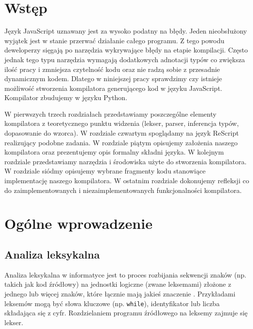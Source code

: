 \documentclass[a4paper,12pt]{book} %
\begin{document}
\sloppy



\thispagestyle{empty}


\newpage{}

\thispagestyle{empty}

\newpage{}



\tableofcontents{}




\chapter*{Wstęp}
Język JavaScript uznawany jest za wysoko podatny na błędy. Jeden nieobsłużony wyjątek jest w stanie przerwać działanie całego programu. Z tego powodu deweloperzy sięgają po narzędzia wykrywające błędy na etapie kompilacji. Często jednak tego typu narzędzia wymagają dodatkowych adnotacji typów co zwiększa ilość pracy i zmniejsza czytelność kodu oraz nie radzą sobie z przesadnie dynamicznym kodem. Dlatego w niniejszej pracy sprawdzimy czy istnieje możliwość stworzenia kompilatora generującego kod w języku JavaScript. Kompilator zbudujemy w języku Python.

W pierwszych trzech rozdziałach przedstawiamy poszczególne elementy kompilatora z teoretycznego punktu widzenia (lekser, parser, inferencja typów, dopasowanie do wzorca). W rozdziale czwartym spoglądamy na język ReScript realizujący podobne zadania. W rozdziale piątym opisujemy założenia naszego kompilatora oraz prezentujemy opis formalny składni języka. W kolejnym rozdziale przedstawiamy narzędzia i środowiska użyte do stworzenia kompilatora. W rozdziale siódmy opisujemy wybrane fragmenty kodu stanowiące implementację naszego kompilatora. W ostatnim rozdziale dokonujemy refleksji co do zaimplementowanych i niezaimplementowanych funkcjonalności kompilatora.

\chapter{Ogólne wprowadzenie}
\section{Analiza leksykalna}
Analiza leksykalna w informatyce jest to proces rozbijania sekwencji znaków (np. takich jak kod źródłowy) na jednostki logiczne (zwane leksemami) złożone z jednego lub więcej znaków, które łącznie mają jakieś znaczenie \cite{Hopcroft__Motwani__Ullman__2005}. Przykładami leksemów mogą być słowa kluczowe (np. \lstinline$while$), identyfikator lub liczba składająca się z cyfr. Rozdzielaniem programu źródłowego na leksemy zajmuje się lekser.
\end{document}
